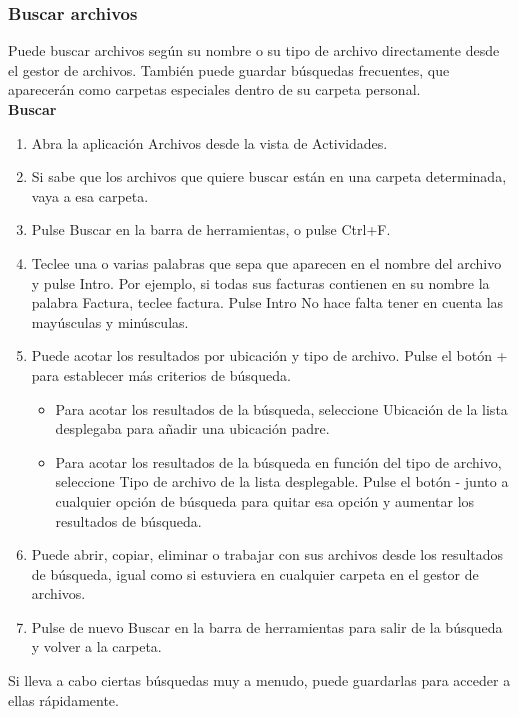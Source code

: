 \subsubsection{Buscar archivos}
Puede buscar archivos según su nombre o su tipo de archivo directamente desde el gestor de archivos. También puede guardar búsquedas frecuentes, que aparecerán como carpetas especiales dentro de su carpeta personal.\\

{\large \bf Buscar}
\begin{enumerate}
\item Abra la aplicación Archivos desde la vista de Actividades.
\item Si sabe que los archivos que quiere buscar están en una carpeta determinada, vaya a esa carpeta.
\item Pulse Buscar en la barra de herramientas, o pulse Ctrl+F.
\item Teclee una o varias palabras que sepa que aparecen en el nombre del archivo y pulse Intro. Por ejemplo, si todas sus facturas contienen en su nombre la palabra Factura, teclee factura. Pulse Intro No hace falta tener en cuenta las mayúsculas y minúsculas.
\item Puede acotar los resultados por ubicación y tipo de archivo. Pulse el botón + para establecer más criterios de búsqueda.
\begin{itemize}
\item Para acotar los resultados de la búsqueda, seleccione Ubicación de la lista desplegaba para añadir una ubicación padre.
\item Para acotar los resultados de la búsqueda en función del tipo de archivo, seleccione Tipo de archivo de la lista desplegable.
Pulse el botón - junto a cualquier opción de búsqueda para quitar esa opción y aumentar los resultados de búsqueda.
\end{itemize}
\item Puede abrir, copiar, eliminar o trabajar con sus archivos desde los resultados de búsqueda, igual como si estuviera en cualquier carpeta en el gestor de archivos.
\item Pulse de nuevo Buscar en la barra de herramientas para salir de la búsqueda y volver a la carpeta.
\end{enumerate}
Si lleva a cabo ciertas búsquedas muy a menudo, puede guardarlas para acceder a ellas rápidamente.\\

